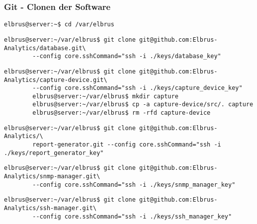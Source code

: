 \documentclass{article}
\begin{document}
	\subsubsection{Git - Clonen der Software}
	\begin{lstlisting}[caption={Wechseln des Verzeichnisses.}]
		elbrus@server:~$ cd /var/elbrus
	\end{lstlisting}
	
	\begin{lstlisting}[caption={Clonen der Datenbank Software.}]
		elbrus@server:~/var/elbrus$ git clone git@github.com:Elbrus-Analytics/database.git\
		--config core.sshCommand="ssh -i ./keys/database_key"
	\end{lstlisting}
	
	\begin{lstlisting}[caption={Clonen der Capture-Device Software.}]
		elbrus@server:~/var/elbrus$ git clone git@github.com:Elbrus-Analytics/capture-device.git\
		--config core.sshCommand="ssh -i ./keys/capture_device_key"
		elbrus@server:~/var/elbrus$ mkdir capture
		elbrus@server:~/var/elbrus$ cp -a capture-device/src/. capture
		elbrus@server:~/var/elbrus$ rm -rfd capture-device
	\end{lstlisting}
	

	\begin{lstlisting}[caption={Clonen der Report-Generator Software.}]
		elbrus@server:~/var/elbrus$ git clone git@github.com:Elbrus-Analytics/\
		report-generator.git --config core.sshCommand="ssh -i ./keys/report_generator_key"
	\end{lstlisting}
	
	\newpage
	\begin{lstlisting}[caption={Clonen der SNMP-Manager Software.}]
		elbrus@server:~/var/elbrus$ git clone git@github.com:Elbrus-Analytics/snmp-manager.git\
		--config core.sshCommand="ssh -i ./keys/snmp_manager_key"
	\end{lstlisting}

	\begin{lstlisting}[caption={Clonen der SSH-Manager Software.}]
		elbrus@server:~/var/elbrus$ git clone git@github.com:Elbrus-Analytics/ssh-manager.git\
		--config core.sshCommand="ssh -i ./keys/ssh_manager_key"
	\end{lstlisting}
	
\end{document}
